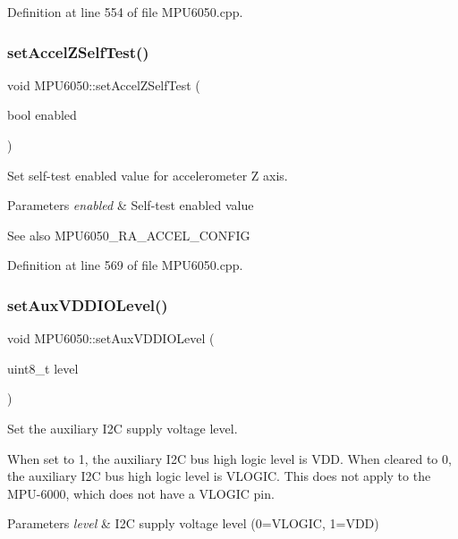 Definition at line 554 of file M\+P\+U6050.\+cpp.

\mbox{\label{classMPU6050_a8eb8ba039af9a47e0475a3835b87f404}} 
\subsubsection{\texorpdfstring{setAccelZSelfTest()}{setAccelZSelfTest()}}
{\footnotesize\ttfamily void M\+P\+U6050\+::set\+Accel\+Z\+Self\+Test (\begin{DoxyParamCaption}\item[{bool}]{enabled }\end{DoxyParamCaption})}



Set self-\/test enabled value for accelerometer Z axis. 


\begin{DoxyParams}{Parameters}
{\em enabled} & Self-\/test enabled value \\
\hline
\end{DoxyParams}
\begin{DoxySeeAlso}{See also}
M\+P\+U6050\+\_\+\+R\+A\+\_\+\+A\+C\+C\+E\+L\+\_\+\+C\+O\+N\+F\+IG 
\end{DoxySeeAlso}


Definition at line 569 of file M\+P\+U6050.\+cpp.

\mbox{\label{classMPU6050_a7c666c20e26869bc80646f1b2c3d69bc}} 
\subsubsection{\texorpdfstring{setAuxVDDIOLevel()}{setAuxVDDIOLevel()}}
{\footnotesize\ttfamily void M\+P\+U6050\+::set\+Aux\+V\+D\+D\+I\+O\+Level (\begin{DoxyParamCaption}\item[{uint8\+\_\+t}]{level }\end{DoxyParamCaption})}



Set the auxiliary I2C supply voltage level. 

When set to 1, the auxiliary I2C bus high logic level is V\+DD. When cleared to 0, the auxiliary I2C bus high logic level is V\+L\+O\+G\+IC. This does not apply to the M\+P\+U-\/6000, which does not have a V\+L\+O\+G\+IC pin. 
\begin{DoxyParams}{Parameters}
{\em level} & I2C supply voltage level (0=V\+L\+O\+G\+IC, 1=V\+DD) \\
\hline
\end{DoxyParams}


